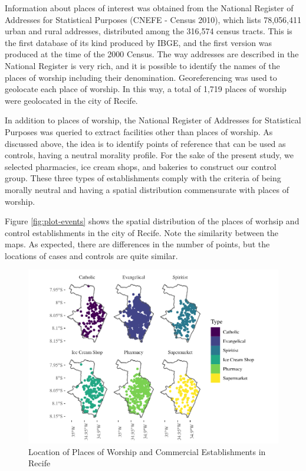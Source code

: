 \documentclass[smallextended]{svjour3}       %
\begin{document}
Information about places of interest was obtained from the National
Register of Addresses for Statistical Purposes (CNEFE - Census 2010),
which lists 78,056,411 urban and rural addresses, distributed among the
316,574 census tracts. This is the first database of its kind produced
by IBGE, and the first version was produced at the time of the 2000
Census. The way addresses are described in the National Register is very
rich, and it is possible to identify the names of the places of worship
including their denomination. Georeferencing was used to geolocate each
place of worship. In this way, a total of 1,719 places of worship were
geolocated in the city of Recife.

In addition to places of worship, the National Register of Addresses for
Statistical Purposes was queried to extract facilities other than places
of worship. As discussed above, the idea is to identify points of
reference that can be used as controls, having a neutral morality
profile. For the sake of the present study, we selected pharmacies, ice
cream shops, and bakeries to construct our control group. These three
types of establishments comply with the criteria of being morally
neutral and having a spatial distribution commensurate with places of
worship.

Figure \ref{fig:plot-events} shows the spatial distribution of the
places of worhsip and control establishments in the city of Recife. Note
the similarity between the maps. As expected, there are differences in
the number of points, but the locations of cases and controls are quite
similar.

\begin{figure}

\includegraphics{Moral_Communities_and_Crime_v1_files/figure-latex/fig-plot-events-1} \hfill{}

\caption{\label{fig:plot-events}Location of Places of Worship and Commercial Establishments in Recife}\label{fig:fig-plot-events}
\end{figure}
\end{document}
